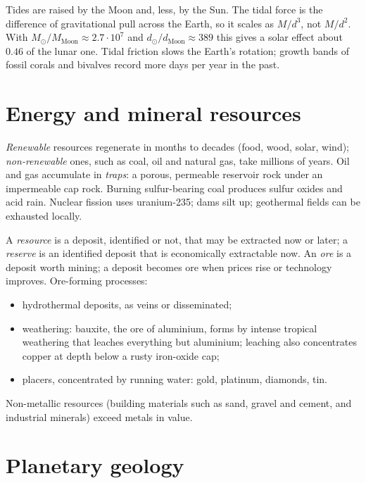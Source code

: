 \begin{remark}
\label{remark-tides}
Tides are raised by the Moon and, less, by
the Sun. The tidal force is the difference
of gravitational pull across the Earth, so
it scales as $M/d^3$, not $M/d^2$. With
$M_\odot/M_{\mathrm{Moon}}\approx
2.7\cdot 10^{7}$ and
$d_\odot/d_{\mathrm{Moon}}\approx 389$ this
gives a solar effect about $0.46$ of the
lunar one. Tidal friction slows the
Earth's rotation; growth bands of fossil
corals and bivalves record more days per
year in the past.
\end{remark}

\section{Energy and mineral resources}
\label{section-resources}

\emph{Renewable} resources regenerate in
months to decades (food, wood, solar,
wind); \emph{non-renewable} ones, such as
coal, oil and natural gas, take millions
of years. Oil and gas accumulate in
\emph{traps}: a porous, permeable reservoir
rock under an impermeable cap rock. Burning
sulfur-bearing coal produces sulfur oxides
and acid rain. Nuclear fission uses
uranium-235; dams silt up; geothermal
fields can be exhausted locally.

A \emph{resource} is a deposit, identified
or not, that may be extracted now or later;
a \emph{reserve} is an identified deposit
that is economically extractable now. An
\emph{ore} is a deposit worth mining; a
deposit becomes ore when prices rise or
technology improves. Ore-forming processes:
\begin{itemize}
\item hydrothermal deposits, as veins or
disseminated;
\item weathering: bauxite, the ore of
aluminium, forms by intense tropical
weathering that leaches everything but
aluminium; leaching also concentrates
copper at depth below a rusty iron-oxide
cap;
\item placers, concentrated by running
water: gold, platinum, diamonds, tin.
\end{itemize}
Non-metallic resources (building materials
such as sand, gravel and cement, and
industrial minerals) exceed metals in
value.

\section{Planetary geology}
\label{section-planetary-geology}

